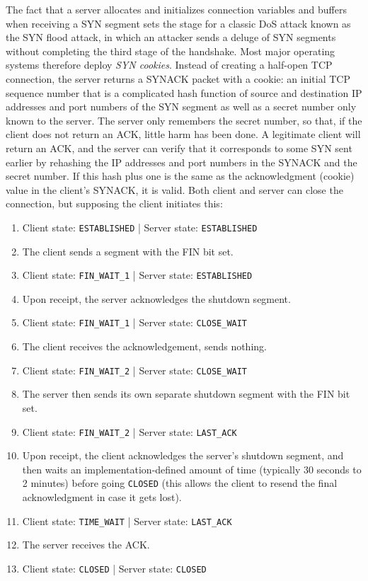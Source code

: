 \documentclass[table, xcdraw]{article}%
\begin{document}
The fact that a server allocates and initializes connection variables and buffers when receiving a SYN segment sets the stage for a classic DoS attack known as the SYN flood attack, in which an attacker sends a deluge of SYN segments without completing the third stage of the handshake. Most major operating systems therefore deploy \emph{SYN cookies}. Instead of creating a half-open TCP connection, the server returns a SYNACK packet with a cookie: an initial TCP sequence number that is a complicated hash function of source and destination IP addresses and port numbers of the SYN segment as well as a secret number only known to the server. The server only remembers the secret number, so that, if the client does not return an ACK, little harm has been done. A legitimate client will return an ACK, and the server can verify that it corresponds to some SYN sent earlier by rehashing the IP addresses and port numbers in the SYNACK and the secret number. If this hash plus one is the same as the acknowledgment (cookie) value in the client’s SYNACK, it is valid.
Both client and server can close the connection, but supposing the client initiates this:

\begin{enumerate}
    \item[\textbullet] Client state: \texttt{ESTABLISHED} | Server state: \texttt{ESTABLISHED}
    \item The client sends a segment with the FIN bit set.
    \item[\textbullet] Client state: \texttt{FIN_WAIT_1} | Server state: \texttt{ESTABLISHED}
    \item Upon receipt, the server acknowledges the shutdown segment.
    \item[\textbullet] Client state: \texttt{FIN_WAIT_1} | Server state: \texttt{CLOSE_WAIT}
    \item The client receives the acknowledgement, sends nothing.
    \item[\textbullet] Client state: \texttt{FIN_WAIT_2} | Server state: \texttt{CLOSE_WAIT}
    \item The server then sends its own separate shutdown segment with the FIN bit set.
    \item[\textbullet] Client state: \texttt{FIN_WAIT_2} | Server state: \texttt{LAST_ACK}
    \item Upon receipt, the client acknowledges the server's shutdown segment, and then waits an implementation-defined amount of time (typically 30 seconds to 2 minutes) before going \texttt{CLOSED} (this allows the client to resend the final acknowledgment in case it gets lost).
    \item[\textbullet] Client state: \texttt{TIME_WAIT} | Server state: \texttt{LAST_ACK}
    \item The server receives the ACK.
    \item[\textbullet] Client state: \texttt{CLOSED} | Server state: \texttt{CLOSED}
\end{enumerate}
\end{document}
